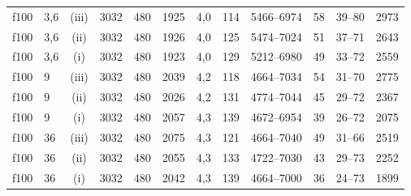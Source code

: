 \begin{tabular}{llc ccccc ccc c}
\midrule
f100 & 3{,}6 & (iii) & 3032 & 480 & 1925 & 4{,}0 & 114 & 5466--6974 & 58 & 39--80 & 2973\\
f100 & 3{,}6 & (ii) & 3032 & 480 & 1926 & 4{,}0 & 125 & 5474--7024 & 51 & 37--71 & 2643\\
f100 & 3{,}6 & (i) & 3032 & 480 & 1923 & 4{,}0 & 129 & 5212--6980 & 49 & 33--72 & 2559\\
f100 & 9 & (iii) & 3032 & 480 & 2039 & 4{,}2 & 118 & 4664--7034 & 54 & 31--70 & 2775\\
f100 & 9 & (ii) & 3032 & 480 & 2026 & 4{,}2 & 131 & 4774--7044 & 45 & 29--72 & 2367\\
f100 & 9 & (i) & 3032 & 480 & 2057 & 4{,}3 & 139 & 4672--6954 & 39 & 26--72 & 2075\\
f100 & 36 & (iii) & 3032 & 480 & 2075 & 4{,}3 & 121 & 4664--7040 & 49 & 31--66 & 2519\\
f100 & 36 & (ii) & 3032 & 480 & 2055 & 4{,}3 & 133 & 4722--7030 & 43 & 29--73 & 2252\\
f100 & 36 & (i) & 3032 & 480 & 2042 & 4{,}3 & 139 & 4664--7000 & 36 & 24--73 & 1899\\
\bottomrule
\end{tabular}
